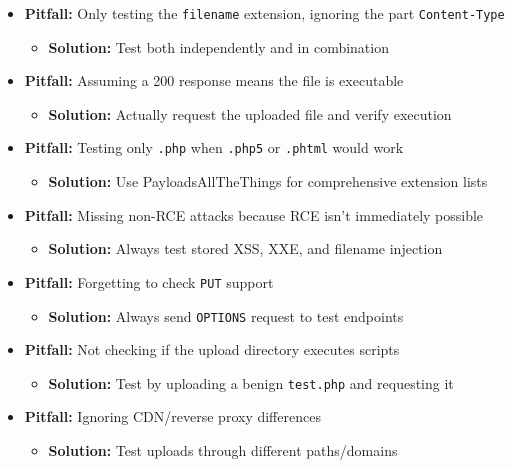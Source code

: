 \documentclass[11pt]{article}
\begin{document}
\begin{itemize}
    \item \textbf{Pitfall:} Only testing the \texttt{filename} extension, ignoring the part \texttt{Content-Type}
    \begin{itemize}
        \item \textbf{Solution:} Test both independently and in combination
    \end{itemize}
    
    \item \textbf{Pitfall:} Assuming a 200 response means the file is executable
    \begin{itemize}
        \item \textbf{Solution:} Actually request the uploaded file and verify execution
    \end{itemize}
    
    \item \textbf{Pitfall:} Testing only \texttt{.php} when \texttt{.php5} or \texttt{.phtml} would work
    \begin{itemize}
        \item \textbf{Solution:} Use PayloadsAllTheThings for comprehensive extension lists
    \end{itemize}
    
    \item \textbf{Pitfall:} Missing non-RCE attacks because RCE isn't immediately possible
    \begin{itemize}
        \item \textbf{Solution:} Always test stored XSS, XXE, and filename injection
    \end{itemize}
    
    \item \textbf{Pitfall:} Forgetting to check \texttt{PUT} support
    \begin{itemize}
        \item \textbf{Solution:} Always send \texttt{OPTIONS} request to test endpoints
    \end{itemize}
    
    \item \textbf{Pitfall:} Not checking if the upload directory executes scripts
    \begin{itemize}
        \item \textbf{Solution:} Test by uploading a benign \texttt{test.php} and requesting it
    \end{itemize}
    
    \item \textbf{Pitfall:} Ignoring CDN/reverse proxy differences
    \begin{itemize}
        \item \textbf{Solution:} Test uploads through different paths/domains
    \end{itemize}
\end{itemize}
\end{document}
